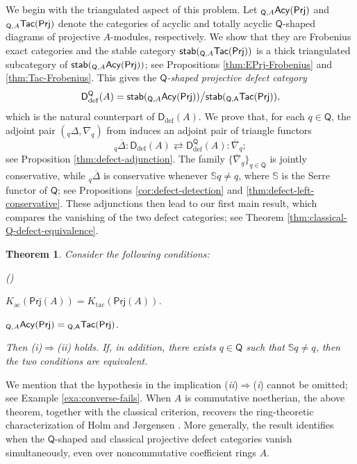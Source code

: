 \documentclass{amsart}
\newtheorem{intthm}{Theorem}[]
\theoremstyle{bfupright head,slanted body}
\theoremstyle{bfupright head,upright body}
\theoremstyle{fixed bf head,slanted body}
\theoremstyle{fixed bf head,upright body}
\theoremstyle{numbered paragraph}
\newlength{\thmlistleft}        %
\newlength{\thmlistright}       %
\newlength{\thmlistpartopsep}   %
\newlength{\thmlisttopsep}      %
\newlength{\thmlistparsep}      %
\newlength{\thmlistitemsep}     %
\newcounter{eqc}
\newenvironment{eqc}{\begin{list}{\upshape (\textit{\roman{eqc}})}%
		{\usecounter{eqc}%
			\setlength{\leftmargin}{\thmlistleft}%
			\setlength{\labelwidth}{\thmlistleft}%
			\setlength{\rightmargin}{\thmlistright}%
			\setlength{\partopsep}{\thmlistpartopsep}%
			\setlength{\topsep}{\thmlisttopsep}%
			\setlength{\parsep}{\thmlistparsep}%
			\setlength{\itemsep}{\thmlistitemsep}}}%
	{\end{list}}%
\newcommand{\eqclbl}[1]{{\upshape(\textit{#1})}}
\numberwithin{equation}{res}
\newcommand{\TacQ}{{}_{\Q,A}\mathsf{Tac}(\sf Prj)}
\newcommand{\AcQ}{{}_{\Q,A}\mathsf{Acy}(\sf Prj)}
\newcommand{\Prj}[1]{\mathsf{Prj}(#1)}
\newcommand{\Q}{\mathsf{Q}}
\begin{document}
We begin with the triangulated aspect of this problem. Let $\AcQ$ and $\TacQ$ denote the categories of acyclic and totally acyclic $\Q$-shaped \mbox{diagrams} of projective $A$-modules, respectively. We show that they are Frobenius exact categories and the stable category $\mathsf{stab}(\TacQ)$ is a thick triangulated subcategory of $\mathsf{stab}(\AcQ)$; see Propositions \ref{thm:EPrj-Frobenius} and \ref{thm:Tac-Frobenius}. This gives the \emph{$\Q$-shaped projective defect category}
$$\mathsf D_{\mathrm{def}}^{\Q}(A)=\mathsf{stab}(\AcQ)\big/\mathsf{stab}(\TacQ),$$
which is the natural counterpart of $\mathsf D_{\mathrm{def}}(A)$. We prove that, for each $q\in\Q$, the adjoint pair $({}_q\Delta, \nabla_q)$ from \cite{HJ26} induces an adjoint pair of triangle functors
$${}_q\overline{\Delta}:\mathsf D_{\mathrm{def}}(A) \rightleftarrows
\mathsf D_{\mathrm{def}}^{\Q}(A):\overline{\nabla}_q;$$
see Proposition \ref{thm:defect-adjunction}. The family $\{\overline{\nabla}_q\}_{q\in\Q}$ is jointly conservative, while ${}_q\overline{\Delta}$ is conservative whenever $\mathbb S q\neq q$, where $\mathbb S$ is the Serre functor of $\Q$; see Propositions \ref{cor:defect-detection} and \ref{thm:defect-left-conservative}. These adjunctions then lead to our first main result, which compares the vanishing of the two defect categories; see Theorem \ref{thm:classical-Q-defect-equivalence}.

\begin{intthm}\label{thmA}
Consider the following conditions:
\begin{eqc}
\item $K_{\mathrm{ac}}(\Prj A)=K_{\mathrm{tac}}(\Prj A)$.
\item $\AcQ=\TacQ$.
\end{eqc}
Then \eqclbl{i}$\Longrightarrow$\eqclbl{ii} holds. If, in addition, there exists $q\in\Q$ such that $\mathbb S q\neq q$, then the two conditions are equivalent.
\end{intthm}

We mention that the hypothesis in the implication \eqclbl{ii}$\Longrightarrow$\eqclbl{i} cannot be omitted; see Example \ref{exa:converse-fails}. When $A$ is commutative noetherian, the above theorem, together with the classical criterion, recovers the ring-theoretic characterization of Holm and J{\o}rgensen \cite[Theorem B]{HJ26}. More generally, the result identifies when the
$\Q$-shaped and classical projective defect categories vanish simultaneously, even over noncommutative coefficient rings $A$.
\end{document}
